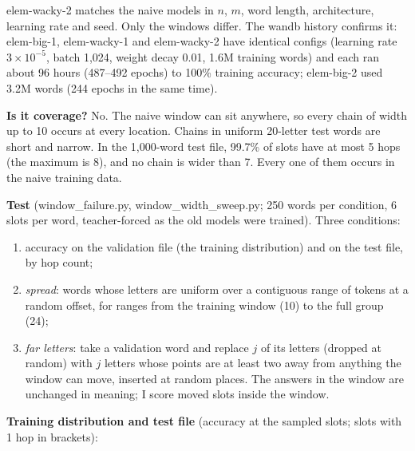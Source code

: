 \documentclass[paper=a4,fontsize=11pt,DIV=11,parskip=half,headings=small,numbers=noendperiod]{scrartcl}
\DeclareRobustCommand{\lead}[1]{\textsf{\bfseries\color{accent}#1}}
\DeclareRobustCommand{\code}[1]{{\fontseries{m}\ttfamily #1}}
\begin{document}
\code{elem-\allowbreak{}wacky-\allowbreak{}2} matches the naive models in $n$, $m$, word length, architecture,
learning rate and seed. Only the windows differ. The wandb history confirms it:
\code{elem-\allowbreak{}big-\allowbreak{}1}, \code{elem-\allowbreak{}wacky-\allowbreak{}1} and
\code{elem-\allowbreak{}wacky-\allowbreak{}2} have identical configs (learning rate $3\times10^{-5}$, batch
1,024, weight decay 0.01, 1.6M training words) and each ran about 96 hours (487–492 epochs) to 100\% training
accuracy; \code{elem-\allowbreak{}big-\allowbreak{}2} used 3.2M words (244 epochs in the same time).

\lead{Is it coverage?} No. The naive window can sit anywhere, so every chain of width up to 10 occurs at every
location. Chains in uniform 20-letter test words are short and narrow. In the 1,000-word test file, 99.7\% of
slots have at most 5 hops (the maximum is 8), and no chain is wider than 7. Every one of them occurs in the
naive training data.

\lead{Test} (\code{window\_\allowbreak{}failure.\allowbreak{}py},
\code{window\_\allowbreak{}width\_\allowbreak{}sweep.\allowbreak{}py}; 250 words per condition, 6 slots per
word, teacher-forced as the old models were trained). Three conditions:

\begin{enumerate}
\item accuracy on the validation file (the training distribution) and on the test file, by hop count;
\item \emph{spread}: words whose letters are uniform over a contiguous range of tokens at a random offset, for
  ranges from the training window (10) to the full group (24);
\item \emph{far letters}: take a validation word and replace $j$ of its letters (dropped at random) with $j$
  letters whose points are at least two away from anything the window can move, inserted at random places. The
  answers in the window are unchanged in meaning; I score moved slots inside the window.
\end{enumerate}

\lead{Training distribution and test file} (accuracy at the sampled slots; slots with 1 hop in brackets):
\end{document}
